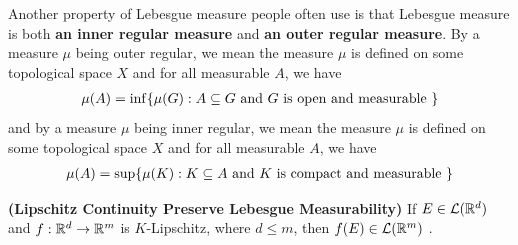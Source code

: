 \documentclass{report}
\begin{document}
\begin{mdframed}
Another property of Lebesgue measure people often use is that Lebesgue measure is both \textbf{an inner regular measure} and \textbf{an outer regular measure}. By a measure $\mu$ being outer regular, we mean the measure $\mu$ is defined on some topological space $X$ and for all measurable $A$, we have 
 \begin{align*}
\mu (A)= \inf \{ \mu (G):A\subseteq G\text{ and }G\text{ is open and measurable } \}
\end{align*}
and by a measure $\mu$ being inner regular, we mean the measure $\mu$ is defined on some topological space $X$ and for all measurable  $A$, we have 
 \begin{align*}
\mu (A)= \sup \{ \mu (K):K \subseteq A\text{ and }K\text{ is compact and measurable } \}
\end{align*}

\end{mdframed}
\begin{theorem}
\textbf{(Lipschitz Continuity Preserve Lebesgue Measurability)} If $E\in \mathcal{L}(\mathbb{R}^d)$ and $f:\mathbb{R}^d\rightarrow \mathbb{R}^m$ is $K$-Lipschitz, where $d\leq m$, then  $f(E)\in \mathcal{L}(\mathbb{R}^m)$ .
\end{theorem}
\end{document}
